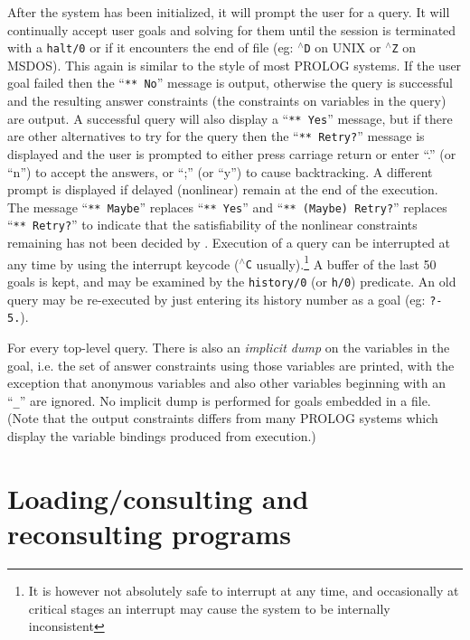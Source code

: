 After the system has been initialized, it will prompt the user for a query.
\chgbarbegin
It will continually accept user goals and solving for them
until the session is terminated with a {\tt halt/0} or if
it encounters the end of file (eg: {\tt $^\wedge$D} on UNIX or 
{\tt $^\wedge$Z} on MSDOS).
This again is similar to the style of most PROLOG systems. 
If the user goal failed then the ``{\tt *** No}'' message is output, otherwise
the query is successful and the
resulting answer constraints (the constraints on variables in the
query) are output.
A successful query will also display a ``{\tt *** Yes}'' message,
but if there are other alternatives to try for the query then 
the ``{\tt *** Retry?}'' message is displayed and the 
user is prompted to either press carriage return or enter ``.'' (or ``n'') 
to accept the
answers, or ``;'' (or ``y'') to cause backtracking.
A different prompt is displayed if delayed (nonlinear) 
remain at the end 
of the execution.
The message ``{\tt *** Maybe}'' replaces ``{\tt *** Yes}''
and ``{\tt *** (Maybe) Retry?}'' replaces ``{\tt *** Retry?}''
to indicate that the satisfiability of the nonlinear constraints remaining
has not been decided by \CLPR.
Execution of a query can be interrupted at any time by using
the interrupt keycode ({\tt $^\wedge$C} usually).\footnote{It is however
not absolutely safe to interrupt at any time,
and occasionally at critical stages
an interrupt may cause the system to be internally inconsistent}
\chgbarend
A buffer of the last 50 goals is kept, and may
be examined by the {\tt history/0} (or {\tt h/0}) predicate. 
An old query may be re-executed by just
entering its history number as a goal (eg: {\tt ?- 5.}).

For every top-level query. There is also an {\em implicit dump} on
the variables in the goal, i.e. the set of answer constraints
using those variables are printed, with the exception that anonymous
variables and also other variables beginning with an ``{\tt \_}''
are ignored.
No implicit dump is performed for goals embedded in a file.
(Note that the output constraints differs from many PROLOG systems
which display the variable bindings produced from execution.)

\section{Loading/consulting and reconsulting programs}
\chgbarbegin

